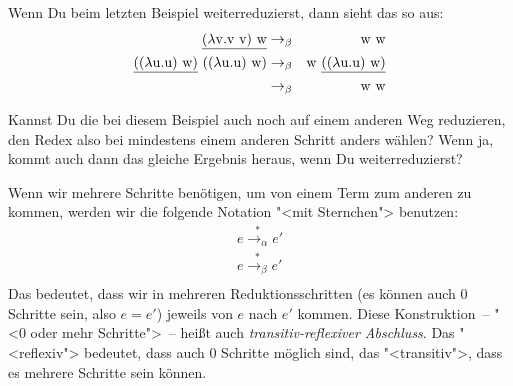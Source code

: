 
Wenn Du beim letzten Beispiel weiterreduzierst, dann sieht das so aus:
%
\begin{eqnarray*}
  \underline{(\lambda \mathrm v .\mathrm v~\mathrm v)~\mathrm w} & \rightarrow_{\beta} & \mathrm w~\mathrm w\\
  \underline{((\lambda \mathrm u.\mathrm u)~\mathrm w)}~((\lambda \mathrm u.\mathrm u)~\mathrm w)
  & \rightarrow_{\beta} & 
  \mathrm w~\underline{((\lambda \mathrm u.\mathrm u)~\mathrm w)} \\
  & \rightarrow_{\beta} & \mathrm w~\mathrm w
\end{eqnarray*}
%
\begin{aufgabeinline}
  Kannst Du die bei diesem Beispiel auch noch auf einem anderen Weg
  reduzieren, den Redex also bei mindestens einem anderen Schritt
  anders wählen?  Wenn ja, kommt auch dann das gleiche Ergebnis
  heraus, wenn Du weiterreduzierst?
\end{aufgabeinline}
%
Wenn wir mehrere Schritte benötigen, um von einem Term zum anderen zu
kommen, werden wir die folgende Notation "<mit Sternchen"> benutzen:
%
\begin{eqnarray*}
  e \overset{\ast}{\rightarrow_\alpha} e'\\
  e \overset{\ast}{\rightarrow_\beta} e'\\
\end{eqnarray*}
%
Das bedeutet, dass wir in mehreren Reduktionsschritten (es können auch
0 Schritte sein, also $e = e'$) jeweils von $e$ nach $e'$ kommen.
Diese Konstruktion~-- "<0 oder mehr Schritte">~-- heißt auch
\textit{transitiv-reflexiver Abschluss}.  Das "<reflexiv">
bedeutet, dass auch 0 Schritte möglich sind, das "<transitiv">, dass
es mehrere Schritte sein können.

